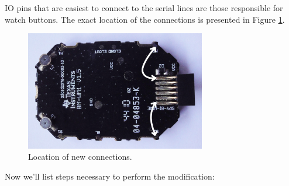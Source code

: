 IO pins that are easiest to connect to the serial lines are those
responsible for watch buttons. The exact location of the connections
is presented in Figure \ref{fig:chronos_where_to_connect}.
\begin{figure}[h]
  \centering
  \includegraphics[width=0.7\textwidth]{img/chronos_where_to_connect.jpg}
  \caption{Location of new connections.}
  \label{fig:chronos_where_to_connect}
\end{figure}
Now we'll list steps necessary to perform the modification:
